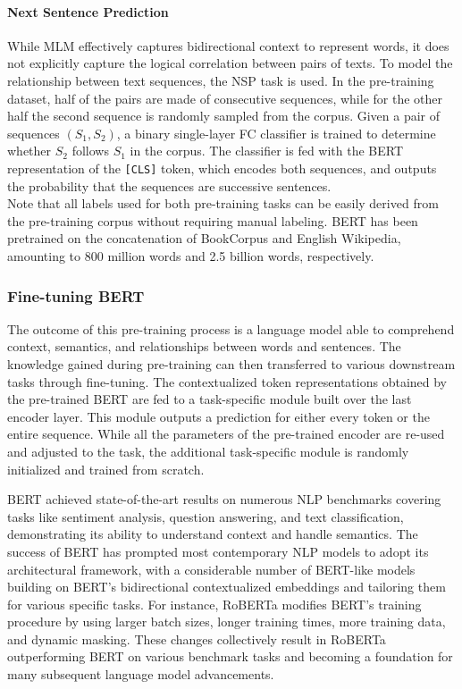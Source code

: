 \paragraph{Next Sentence Prediction}

While \ac{MLM} effectively captures bidirectional context to represent words, it does not explicitly capture the logical correlation between pairs of texts. To model the relationship between text sequences, the \ac{NSP} task is used. In the pre-training dataset, half of the pairs are made of consecutive sequences, while for the other half the second sequence is randomly sampled from the corpus. Given a pair of sequences $(S_1, S_2)$, a binary single-layer \ac{FC} classifier is trained to determine whether $S_2$ follows $S_1$ in the corpus. The classifier is fed with the \ac{BERT} representation of the \texttt{[CLS]} token, which encodes both sequences, and outputs the probability that the sequences are successive sentences. \\ %

Note that all labels used for both pre-training tasks can be easily derived from the pre-training corpus without requiring manual labeling. \ac{BERT} has been pretrained on the concatenation of BookCorpus \citep{zhu2015aligning} and English Wikipedia, amounting to 800 million words and 2.5 billion words, respectively.

\subsubsection{Fine-tuning BERT}

The outcome of this pre-training process is a language model able to comprehend context, semantics, and relationships between words and sentences. The knowledge gained during pre-training can then transferred to various downstream tasks through fine-tuning. The contextualized token representations obtained by the pre-trained \ac{BERT} are fed to a task-specific module built over the last encoder layer. This module outputs a prediction for either every token or the entire sequence. While all the parameters of the pre-trained encoder are re-used and adjusted to the task, the additional task-specific module is randomly initialized and trained from scratch.

\ac{BERT} achieved state-of-the-art results on numerous NLP benchmarks covering tasks like sentiment analysis, question answering, and text classification, demonstrating its ability to understand context and handle semantics. The success of BERT has prompted most contemporary \ac{NLP} models to adopt its architectural framework, with a considerable number of \ac{BERT}-like models building on \ac{BERT}'s bidirectional contextualized embeddings and tailoring them for various specific tasks. For instance, \ac{RoBERTa} \citep{liu2019roberta} modifies BERT's training procedure by using larger batch sizes, longer training times, more training data, and dynamic masking. These changes collectively result in \ac{RoBERTa} outperforming \ac{BERT} on various benchmark tasks and becoming a foundation for many subsequent language model advancements.


